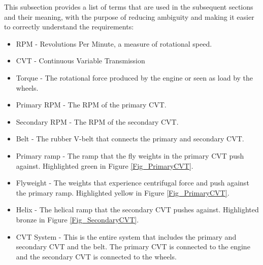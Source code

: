 \documentclass[12pt]{article}
\begin{document}
This subsection provides a list of terms that are used in the subsequent
sections and their meaning, with the purpose of reducing ambiguity and making it
easier to correctly understand the requirements:

\begin{itemize}
  \item RPM - Revolutions Per Minute, a measure of rotational speed.
  \item CVT - Continuous Variable Transmission
  \item Torque - The rotational force produced by the engine or seen as load by the wheels. 
  \item Primary RPM - The RPM of the primary CVT.
  \item Secondary RPM - The RPM of the secondary CVT.
  \item Belt - The rubber V-belt that connects the primary and secondary CVT.
  \item Primary ramp - The ramp that the fly weights in the primary CVT push against. Highlighted green in Figure \ref{Fig_PrimaryCVT}.
  \item Flyweight - The weights that experience centrifugal force and push against the primary ramp. Highlighted yellow in Figure \ref{Fig_PrimaryCVT}.
  \item Helix - The helical ramp that the secondary CVT pushes against. Highlighted bronze in Figure \ref{Fig_SecondaryCVT}.
  \item CVT System - This is the entire system that includes the primary and secondary CVT and the belt. The primary CVT is connected to the engine and the secondary CVT is connected to the wheels.
\end{itemize}
\end{document}
